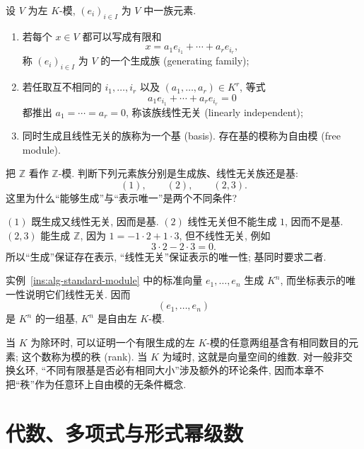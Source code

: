 \documentclass[usesamecnt, thmcnt=section, lang=cn, newtx, 10pt, scheme=chinese]{elegantbook}
\begin{document}
\begin{definition}\label{def:alg-free-module}
设 $V$ 为左 $K$-模, $(e_i)_{i\in I}$ 为 $V$ 中一族元素.
\begin{enumerate}[label=\rm(\arabic*)]
  \item 若每个 $x\in V$ 都可以写成有限和
  \[
   x=a_1e_{i_1}+\cdots+a_re_{i_r},
  \]
  称 $(e_i)_{i\in I}$ 为 $V$ 的一个{\color{blue}生成族 (generating family)};
  \item 若任取互不相同的 $i_1,\ldots,i_r$ 以及 $(a_1,\ldots,a_r)\in K^r$, 等式
  \[
   a_1e_{i_1}+\cdots+a_re_{i_r}=0
  \]
  都推出 $a_1=\cdots=a_r=0$, 称该族{\color{blue}线性无关 (linearly independent)};
  \item 同时生成且线性无关的族称为一个{\color{blue}基 (basis)}. 存在基的模称为{\color{blue}自由模 (free module)}.
\end{enumerate}
\end{definition}

\begin{concept}\label{con:alg-free-module-01}
把 $\mathbb Z$ 看作 $\mathbb Z$-模. 判断下列元素族分别是生成族、线性无关族还是基:
\[
 (1),\qquad (2),\qquad (2,3).
\]
这里为什么``能够生成''与``表示唯一''是两个不同条件?
\end{concept}

\begin{solution}
$(1)$ 既生成又线性无关, 因而是基. $(2)$ 线性无关但不能生成 $1$, 因而不是基. $(2,3)$ 能生成 $\mathbb Z$, 因为 $1=-1\cdot2+1\cdot3$, 但不线性无关, 例如
\[
 3\cdot2-2\cdot3=0.
\]
所以``生成''保证存在表示, ``线性无关''保证表示的唯一性; 基同时要求二者.
\end{solution}

\begin{instance}
实例~\ref{ins:alg-standard-module} 中的标准向量 $e_1,\ldots,e_n$ 生成 $K^n$, 而坐标表示的唯一性说明它们线性无关. 因而
\[
 (e_1,\ldots,e_n)
\]
是 $K^n$ 的一组基, $K^n$ 是自由左 $K$-模.
\end{instance}

\begin{knowledge}[基的大小与秩]
当 $K$ 为除环时, 可以证明一个有限生成的左 $K$-模的任意两组基含有相同数目的元素; 这个数称为模的{\color{blue}秩 (rank)}. 当 $K$ 为域时, 这就是向量空间的维数. 对一般非交换幺环, ``不同有限基是否必有相同大小''涉及额外的环论条件, 因而本章不把``秩''作为任意环上自由模的无条件概念.
\end{knowledge}



\section{代数、多项式与形式幂级数}
\end{document}

